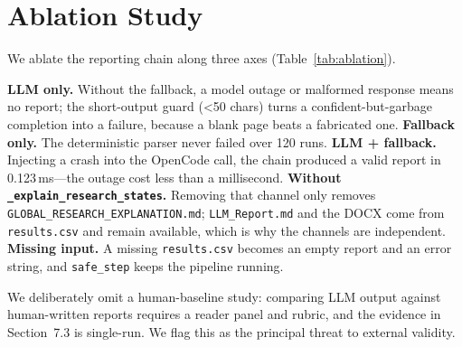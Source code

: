 \documentclass[10pt,twocolumn,letterpaper]{article}
\begin{document}
\section{Ablation Study}
We ablate the reporting chain along three axes (Table~\ref{tab:ablation}).

\begin{table}[htbp]
\centering
\caption{Ablation of the reporting chain (six files (three unique datasets), 20 trials each unless noted)}
\label{tab:ablation}
\end{table}

\textbf{LLM only.} Without the fallback, a model outage or malformed response means no report; the short-output guard (\textless{}50 chars) turns a confident-but-garbage completion into a failure, because a blank page beats a fabricated one. \textbf{Fallback only.} The deterministic parser never failed over 120 runs. \textbf{LLM + fallback.} Injecting a crash into the OpenCode call, the chain produced a valid report in 0.123\,ms---the outage cost less than a millisecond. \textbf{Without \texttt{\_explain\_research\_states}.} Removing that channel only removes \texttt{GLOBAL\_RESEARCH\_EXPLANATION.md}; \texttt{LLM\_Report.md} and the DOCX come from \texttt{results.csv} and remain available, which is why the channels are independent. \textbf{Missing input.} A missing \texttt{results.csv} becomes an empty report and an error string, and \texttt{safe\_step} keeps the pipeline running.

We deliberately omit a human-baseline study: comparing LLM output against human-written reports requires a reader panel and rubric, and the evidence in Section~7.3 is single-run. We flag this as the principal threat to external validity.
\end{document}

